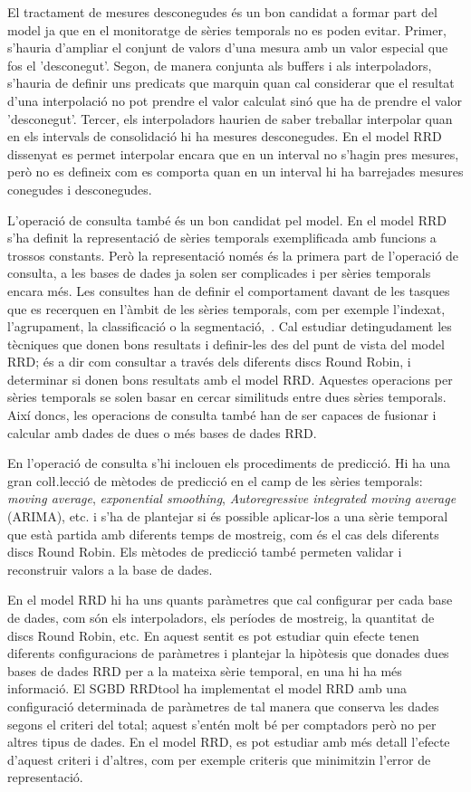 El tractament de mesures desconegudes és un bon candidat a formar part del model ja que en el monitoratge de sèries temporals no es poden evitar. Primer, s'hauria d'ampliar el conjunt de valors d'una mesura amb un valor especial que fos el 'desconegut'. Segon, de manera conjunta als buffers i als interpoladors, s'hauria de definir uns predicats que marquin quan cal considerar que el resultat d'una interpolació no pot prendre el valor calculat sinó que ha de prendre el valor 'desconegut'. Tercer, els interpoladors haurien de saber treballar interpolar quan en els intervals de consolidació hi ha mesures desconegudes. En el model RRD dissenyat es permet interpolar encara que en un interval no s'hagin pres mesures, però no es defineix com es comporta quan en un interval hi ha barrejades mesures conegudes i desconegudes.

L'operació de consulta també és un bon candidat pel model. En el model RRD s'ha definit la representació de sèries temporals exemplificada amb funcions a trossos constants. Però la representació només és la primera part de l'operació de consulta, a les bases de dades ja solen ser complicades i per sèries temporals encara més. Les consultes han de definir el comportament davant de les tasques que es recerquen en l'àmbit de les sèries temporals, com per exemple l'indexat, l'agrupament, la classificació o la segmentació,~\cite{keogh02}. Cal estudiar detingudament les tècniques que donen bons resultats i definir-les des del punt de vista del model RRD; és a dir com consultar a través dels diferents discs Round Robin, i determinar si donen bons resultats amb el model RRD.
Aquestes operacions per sèries temporals se solen basar en cercar similituds entre dues sèries temporals. Així doncs, les operacions de consulta també han de ser capaces de fusionar i calcular amb dades de dues o més bases de dades RRD.


En l'operació de consulta s'hi inclouen els procediments de predicció.  Hi ha una gran col\l.lecció de mètodes de predicció en el camp de les sèries temporals: \emph{moving average}, \emph{exponential smoothing}, \emph{Autoregressive integrated moving average} (ARIMA), etc. i s'ha de plantejar si és possible aplicar-los a una sèrie temporal que està partida amb diferents temps de mostreig, com és el cas dels diferents discs Round Robin. Els mètodes de predicció també permeten validar i reconstruir valors a la base de dades.

En el model RRD hi ha uns quants paràmetres que cal configurar per cada base de dades, com són els interpoladors, els períodes de mostreig, la quantitat de discs Round Robin, etc. En aquest sentit es pot estudiar quin efecte tenen diferents configuracions de paràmetres i plantejar la hipòtesis que donades dues bases de dades RRD per a la mateixa sèrie temporal, en una hi ha més informació. El SGBD RRDtool ha implementat el model RRD amb una configuració determinada de paràmetres de tal manera que conserva les dades segons el criteri del total; aquest s'entén molt bé per comptadors però no  per altres tipus de dades. En el model RRD, es pot estudiar amb més detall l'efecte d'aquest criteri i d'altres, com per exemple criteris que minimitzin l'error de representació.



